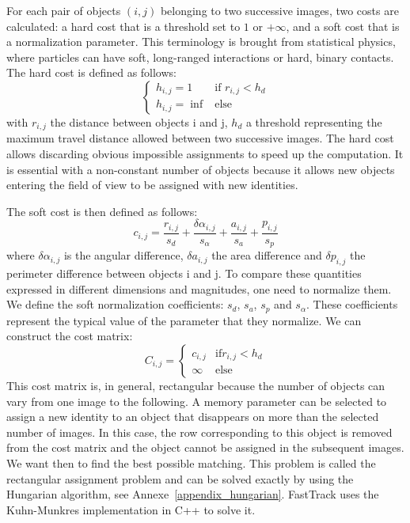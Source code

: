     For each pair of objects $(i,j)$ belonging to two successive images, two costs are calculated: a hard cost that is a threshold set to $1$ or $+ \infty$, and a soft cost that is a normalization parameter. This terminology is brought from statistical physics, where particles can have soft, long-ranged interactions or hard, binary contacts.
    The hard cost is defined as follows:
    \begin{equation}
        \left\{
            \begin{array}{ll}
                h_{i,j} = 1 & \mbox{if } r_{i,j} < h_{d} \\
                h_{i,j} = \inf & \mbox{else }
            \end{array}
        \right.
    \end{equation}
    \noindent with $r_{i,j}$ the distance between objects i and j, $h_{d}$ a threshold representing the maximum travel distance allowed between two successive images. The hard cost allows discarding obvious impossible assignments to speed up the computation. It is essential with a non-constant number of objects because it allows new objects entering the field of view to be assigned with new identities.

    The soft cost is then defined as follows:
    \begin{equation}
        c_{i,j} = \frac{r_{i,j}}{s_d} + \frac{\delta\alpha_{i,j}}{s_{\alpha}} + \frac{a_{i,j}}{s_a} + \frac{p_{i,j}}{s_p}
    \end{equation}
    \noindent where $\delta\alpha_{i,j}$ is the angular difference, $\delta a_{i,j}$ the area difference and $\delta p_{i,j}$ the perimeter difference between objects i and j. To compare these quantities expressed in different dimensions and magnitudes, one need to normalize them. We define the soft normalization coefficients: $s_{d}$, $s_{a}$, $s_{p}$ and $s_{\alpha}$. These coefficients represent the typical value of the parameter that they normalize.
    We can construct the cost matrix:
    \begin{equation}
        C_{i,j} = \left\{
            \begin{array}{ll}
                c_{i,j} & \mbox{if} r_{i,j} < h_{d} \\
                \infty & \mbox{else}
            \end{array}
        \right.
    \end{equation}
    This cost matrix is, in general, rectangular because the number of objects can vary from one image to the following. A memory parameter can be selected to assign a new identity to an object that disappears on more than the selected number of images. In this case, the row corresponding to this object is removed from the cost matrix and the object cannot be assigned in the subsequent images.
    We want then to find the best possible matching. This problem is called the rectangular assignment problem and can be solved exactly by using the Hungarian algorithm, see Annexe~\ref{appendix_hungarian}. FastTrack uses the Kuhn-Munkres implementation in C++ to solve it.

